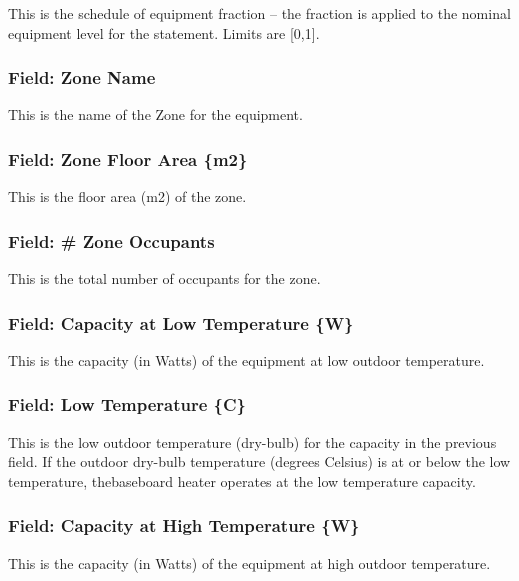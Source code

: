 This is the schedule of equipment fraction -- the fraction is applied to the nominal equipment level for the statement. Limits are {[}0,1{]}.

\subsubsection{Field: Zone Name}\label{field-zone-name-6}

This is the name of the Zone for the equipment.

\subsubsection{Field: Zone Floor Area \{m2\}}\label{field-zone-floor-area-m2-4}

This is the floor area (m2) of the zone.

\subsubsection{Field: \# Zone Occupants}\label{field-zone-occupants-4}

This is the total number of occupants for the zone.

\subsubsection{Field: Capacity at Low Temperature \{W\}}\label{field-capacity-at-low-temperature-w}

This is the capacity (in Watts) of the equipment at low outdoor temperature.

\subsubsection{Field: Low Temperature \{C\}}\label{field-low-temperature-c}

This is the low outdoor temperature (dry-bulb) for the capacity in the previous field. If the outdoor dry-bulb temperature (degrees Celsius) is at or below the low temperature, thebaseboard heater operates at the low temperature capacity.

\subsubsection{Field: Capacity at High Temperature \{W\}}\label{field-capacity-at-high-temperature-w}

This is the capacity (in Watts) of the equipment at high outdoor temperature.

